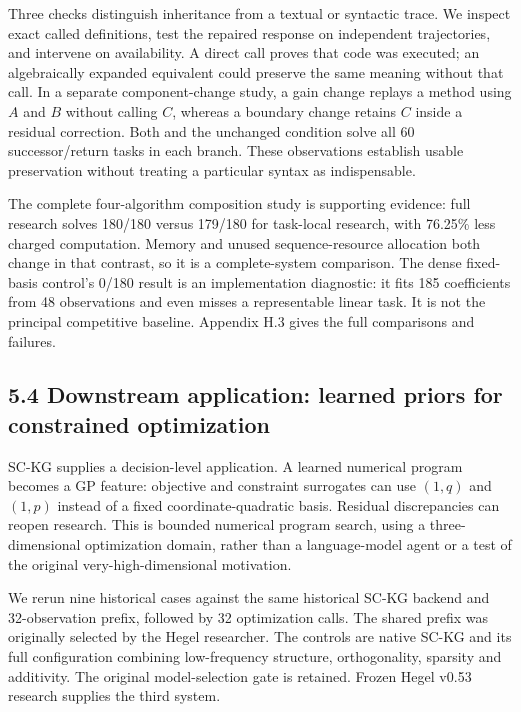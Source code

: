 \documentclass[11pt,a4paper]{article}
\begin{document}
Three checks distinguish inheritance from a textual or syntactic trace. We inspect exact called definitions, test the repaired response on independent trajectories, and intervene on availability. A direct call proves that code was executed; an algebraically expanded equivalent could preserve the same meaning without that call. In a separate component-change study, a gain change replays a method using \(A\) and \(B\) without calling \(C\), whereas a boundary change retains \(C\) inside a residual correction. Both and the unchanged condition solve all 60 successor/return tasks in each branch. These observations establish usable preservation without treating a particular syntax as indispensable.


The complete four-algorithm composition study is supporting evidence: full research solves 180/180 versus 179/180 for task-local research, with 76.25\% less charged computation. Memory and unused sequence-resource allocation both change in that contrast, so it is a complete-system comparison. The dense fixed-basis control's 0/180 result is an implementation diagnostic: it fits 185 coefficients from 48 observations and even misses a representable linear task. It is not the principal competitive baseline. Appendix H.3 gives the full comparisons and failures.


\subsection*{5.4 Downstream application: learned priors for constrained optimization}

SC-KG supplies a decision-level application. A learned numerical program becomes a GP feature: objective and constraint surrogates can use \((1,q)\) and \((1,p)\) instead of a fixed coordinate-quadratic basis. Residual discrepancies can reopen research. This is bounded numerical program search, using a three-dimensional optimization domain, rather than a language-model agent or a test of the original very-high-dimensional motivation.


We rerun nine historical cases against the same historical SC-KG backend and 32-observation prefix, followed by 32 optimization calls. The shared prefix was originally selected by the Hegel researcher. The controls are native SC-KG and its full configuration combining low-frequency structure, orthogonality, sparsity and additivity. The original model-selection gate is retained. Frozen Hegel v0.53 research supplies the third system.
\end{document}
